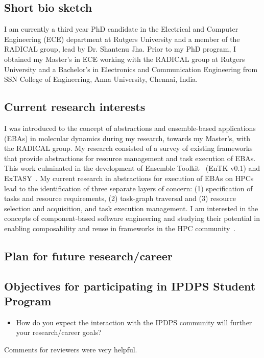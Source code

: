 \subsection{Short bio sketch}
I am currently a third year PhD candidate in the Electrical and Computer 
Engineering (ECE) department at Rutgers University and a member of the RADICAL
group, lead by Dr. Shantenu Jha. Prior to my PhD program, I obtained my Master's
in ECE working with the RADICAL group at Rutgers University and a Bachelor's in 
Electronics and Communication Engineering from SSN College of Engineering, Anna
University, Chennai, India.

\subsection{Current research interests}
I was introduced to the concept of abstractions and ensemble-based applications
(EBAs) in molecular dynamics during my research, towards my Master's, with the 
RADICAL group. My research consisted of a survey of existing frameworks that 
provide abstractions for resource management and task execution of EBAs. This
work culminated in the development of Ensemble Toolkit~\cite{entk} (EnTK v0.1) 
and ExTASY~\cite{extasy}. My current research in abstractions for execution of 
EBAs on HPCs lead to the identification of three separate layers of concern: (1) 
specification of tasks and resource requirements, (2) task-graph traversal and 
(3) resource selection and acquisition, and task execution management. I am 
interested in the concepts of component-based software engineering and studying
their potential in enabling composability and reuse in frameworks in the HPC 
community~\cite{review_bb_2016}.

\subsection{Plan for future research/career}




\subsection{Objectives for participating in IPDPS Student Program}

\begin{itemize}
\item How do you expect the interaction with the IPDPS community will further 
your research/career goals?
\end{itemize}

Comments for reviewers were very helpful.
